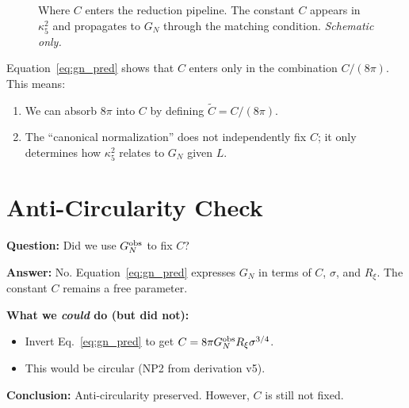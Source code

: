 \documentclass[11pt,a4paper]{article}
\begin{document}
\begin{figure}[h]
\centering
{}
\caption{Where $C$ enters the reduction pipeline. The constant $C$ appears
in $\kappa_5^2$ and propagates to $G_N$ through the matching condition.
\textit{Schematic only.}}
\label{fig:pipeline}
\end{figure}

Equation~\eqref{eq:gn_pred} shows that $C$ enters only in the combination
$C/(8\pi)$. This means:

\begin{enumerate}
\item We can absorb $8\pi$ into $C$ by defining $\tilde{C} = C/(8\pi)$.
\item The ``canonical normalization'' does not independently fix $C$; it
only determines how $\kappa_5^2$ relates to $G_N$ given $L$.
\end{enumerate}

\section{Anti-Circularity Check}

\begin{statusbox}
\textbf{Question:} Did we use $G_N^{\rm obs}$ to fix $C$?

\textbf{Answer:} No. Equation~\eqref{eq:gn_pred} expresses $G_N$ in terms of
$C$, $\sigma$, and $R_\xi$. The constant $C$ remains a free parameter.

\textbf{What we \textit{could} do (but did not):}
\begin{itemize}
\item Invert Eq.~\eqref{eq:gn_pred} to get $C = 8\pi G_N^{\rm obs} R_\xi \sigma^{3/4}$.
\item This would be circular (NP2 from derivation v5).
\end{itemize}

\textbf{Conclusion:} Anti-circularity preserved. However, $C$ is still not
fixed.
\end{statusbox}
\end{document}
